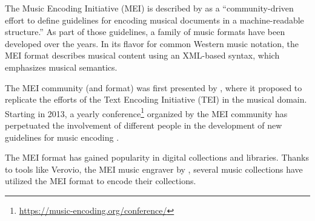 

The Music Encoding Initiative (MEI) is described by
\textcite{hankinson2011music} as a ``community-driven effort
to define guidelines for encoding musical documents in a
machine-readable structure.'' As part of those guidelines, a
family of music formats have been developed over the years.
In its flavor for common Western music notation, the MEI
format describes musical content using an XML-based syntax,
which emphasizes musical semantics.


The MEI community (and format) was first presented by
\textcite{roland2002music}, where it proposed to replicate
the efforts of the Text Encoding Initiative (TEI) in the
musical domain. Starting in 2013, a yearly
conference\footnote{\href{https://music-encoding.org/conference/}{https://music-encoding.org/conference/}}
organized by the MEI community has perpetuated the
involvement of different people in the development of new
guidelines for music encoding
\parencite{crawford2016review}.


The MEI format has gained popularity in digital collections
and libraries. Thanks to tools like Verovio, the MEI music
engraver by \textcite{pugin2014verovio}, several music
collections have utilized the MEI format to encode their
collections.

